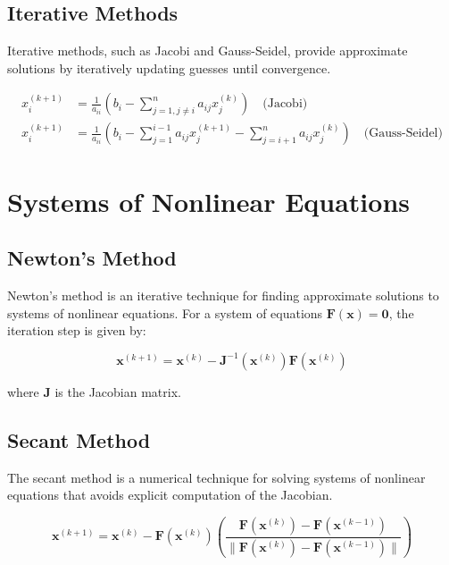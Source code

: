 \documentclass{article}
\begin{document}
\subsection{Iterative Methods}

Iterative methods, such as Jacobi and Gauss-Seidel, provide approximate solutions by iteratively updating guesses until convergence.

\begin{align}
    x_i^{(k+1)} &= \frac{1}{a_{ii}} \left(b_i - \sum_{j=1, j\neq i}^{n} a_{ij} x_j^{(k)}\right) \quad \text{(Jacobi)} \\
    x_i^{(k+1)} &= \frac{1}{a_{ii}} \left(b_i - \sum_{j=1}^{i-1} a_{ij} x_j^{(k+1)} - \sum_{j=i+1}^{n} a_{ij} x_j^{(k)}\right) \quad \text{(Gauss-Seidel)}
\end{align}

\section{Systems of Nonlinear Equations}

\subsection{Newton's Method}

Newton's method is an iterative technique for finding approximate solutions to systems of nonlinear equations. For a system of equations $\mathbf{F}(\mathbf{x}) = \mathbf{0}$, the iteration step is given by:

\begin{equation}
    \mathbf{x}^{(k+1)} = \mathbf{x}^{(k)} - \mathbf{J}^{-1}(\mathbf{x}^{(k)}) \mathbf{F}(\mathbf{x}^{(k)})
\end{equation}

where $\mathbf{J}$ is the Jacobian matrix.

\subsection{Secant Method}

The secant method is a numerical technique for solving systems of nonlinear equations that avoids explicit computation of the Jacobian.

\begin{equation}
    \mathbf{x}^{(k+1)} = \mathbf{x}^{(k)} - \mathbf{F}(\mathbf{x}^{(k)}) \left(\frac{\mathbf{F}(\mathbf{x}^{(k)}) - \mathbf{F}(\mathbf{x}^{(k-1)})}{\|\mathbf{F}(\mathbf{x}^{(k)}) - \mathbf{F}(\mathbf{x}^{(k-1)})\|}\right)
\end{equation}
\end{document}

